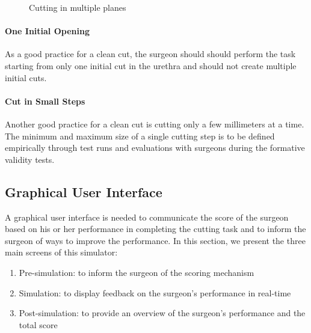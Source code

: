 \begin{figure}
  \centering%
  \hfill%
  \caption{Cutting in multiple planes}\label{fig:cutting_in_multiple_planes}
\end{figure}

\paragraph{One Initial Opening}\label{par:metric_2}
As a good practice for a clean cut, the surgeon should should perform the task starting from only one initial cut in the urethra and should not create multiple initial cuts.

\paragraph{Cut in Small Steps}\label{par:metric_3}
Another good practice for a clean cut is cutting only a few millimeters at a time. The minimum and maximum size of a single cutting step is to be defined empirically through test runs and evaluations with surgeons during the formative validity tests.

\subsection{Graphical User Interface}
A graphical user interface is needed to communicate the score of the surgeon based on his or her performance in completing the cutting task and to inform the surgeon of ways to improve the performance. In this section, we present the three main screens of this simulator:
\begin{enumerate}[1.]
  \item Pre-simulation: to inform the surgeon of the scoring mechanism
  \item Simulation: to display feedback on the surgeon's performance in real-time
  \item Post-simulation: to provide an overview of the surgeon's performance and the total score
\end{enumerate}


